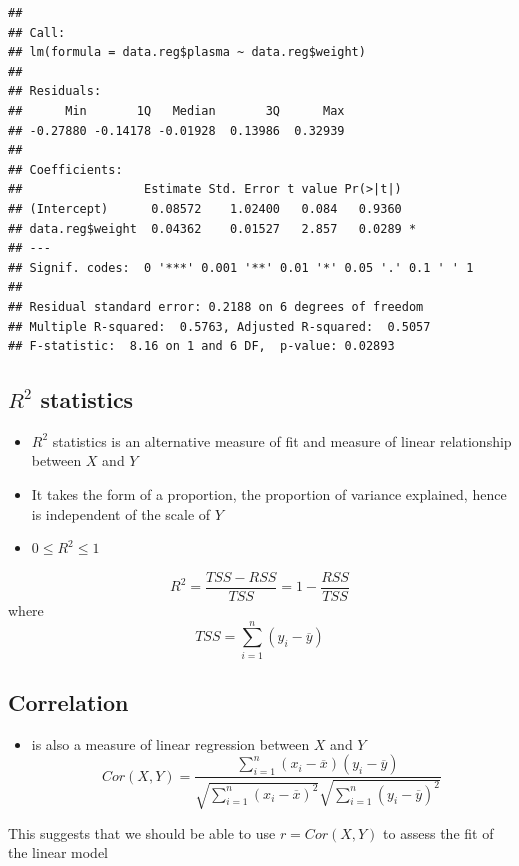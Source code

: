 \documentclass[]{article}
\providecommand{\tightlist}{%
  \setlength{\itemsep}{0pt}\setlength{\parskip}{0pt}}
\begin{document}
\begin{verbatim}
## 
## Call:
## lm(formula = data.reg$plasma ~ data.reg$weight)
## 
## Residuals:
##      Min       1Q   Median       3Q      Max 
## -0.27880 -0.14178 -0.01928  0.13986  0.32939 
## 
## Coefficients:
##                 Estimate Std. Error t value Pr(>|t|)  
## (Intercept)      0.08572    1.02400   0.084   0.9360  
## data.reg$weight  0.04362    0.01527   2.857   0.0289 *
## ---
## Signif. codes:  0 '***' 0.001 '**' 0.01 '*' 0.05 '.' 0.1 ' ' 1
## 
## Residual standard error: 0.2188 on 6 degrees of freedom
## Multiple R-squared:  0.5763, Adjusted R-squared:  0.5057 
## F-statistic:  8.16 on 1 and 6 DF,  p-value: 0.02893
\end{verbatim}

\hypertarget{r2-statistics}{%
\subsection{\texorpdfstring{\(R^2\)
statistics}{R\^{}2 statistics}}\label{r2-statistics}}

\begin{itemize}
\tightlist
\item
  \(R^2\) statistics is an alternative measure of fit and measure of
  linear relationship between \(X\) and \(Y\)
\item
  It takes the form of a proportion, the proportion of variance
  explained, hence is independent of the scale of \(Y\)
\item
  \(0 \leq R^2 \leq 1\)
\end{itemize}

\[R^2=\frac{TSS-RSS}{TSS}=1-\frac{RSS}{TSS}\] where
\[TSS=\sum_{i=1}^{n}(y_i-\overline{y})\]

\hypertarget{correlation}{%
\subsection{Correlation}\label{correlation}}

\begin{itemize}
\tightlist
\item
  is also a measure of linear regression between \(X\) and \(Y\)
  \[Cor(X,Y)=\frac{\sum_{i=1}^{n}(x_i-\overline{x})(y_i-\overline{y})}{\sqrt{\sum_{i=1}^{n}(x_i-\overline{x})^2}\sqrt{\sum_{i=1}^{n}(y_i-\overline{y})^2}}\]
\end{itemize}

This suggests that we should be able to use \(r=Cor(X,Y)\) to assess the
fit of the linear model
\end{document}
